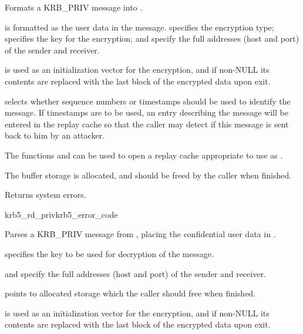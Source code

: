 Formats a KRB_PRIV message into .

 is formatted as the user data in the message.
 specifies the encryption type; 
specifies the key for the encryption;  and
 specify the full addresses (host and port) of the
sender and receiver.

 is used as an initialization vector for the
encryption, and if non-NULL its contents are replaced with the last
block of the encrypted data upon exit.

 selects whether sequence numbers or timestamps
should be used to identify the message.  If timestamps are to be used,
an entry describing the message will be entered in the replay cache
 so that the caller may detect if this message is sent
back to him by an attacker.

The functions  and
 can be used to open a replay cache
appropriate to use as .

The  buffer storage is allocated, and should be freed by the
caller when finished.

Returns system errors.

\begin{funcdecl}{krb5_rd_priv}{krb5_error_code}{\funcin}
\funcinout
{}
\funcout
{}
\end{funcdecl}

Parses a KRB_PRIV message from , placing the confidential user
data in .

 specifies the key to be used for decryption of the message.
 
 and  specify the full
addresses (host and port) of the sender and receiver.

 points to allocated storage which the caller should
free when finished.

 is used as an initialization vector for the
encryption, and if non-NULL its contents are replaced with the last
block of the encrypted data upon exit.

